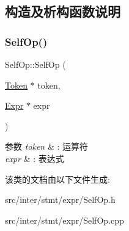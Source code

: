 \subsection{构造及析构函数说明}
\mbox{\label{class_self_op_a5292e81fca1817185db15b29564a32ee}} 
\subsubsection{\texorpdfstring{Self\+Op()}{SelfOp()}}
{\footnotesize\ttfamily Self\+Op\+::\+Self\+Op (\begin{DoxyParamCaption}\item[{\hyperlink{class_token}{Token} $\ast$}]{token,  }\item[{\hyperlink{class_expr}{Expr} $\ast$}]{expr }\end{DoxyParamCaption})}


\begin{DoxyParams}{参数}
{\em token} & \+: 运算符 \\
\hline
{\em expr} & \+: 表达式 \\
\hline
\end{DoxyParams}


该类的文档由以下文件生成\+:\begin{DoxyCompactItemize}
\item 
src/inter/stmt/expr/Self\+Op.\+h\item 
src/inter/stmt/expr/Self\+Op.\+cpp\end{DoxyCompactItemize}
